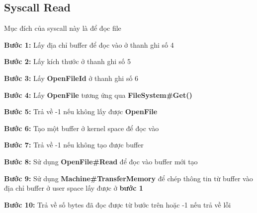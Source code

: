 \subsection{Syscall Read}
Mục đích của syscall này là để đọc file
\begin{addmargin}[40pt]{0pt}
\textbf{Bước 1: }Lấy địa chỉ buffer để đọc vào ở thanh ghi số 4
\end{addmargin}
\begin{addmargin}[40pt]{0pt}
\textbf{Bước 2: }Lấy kích thước ở thanh ghi số 5
\end{addmargin}
\begin{addmargin}[40pt]{0pt}
\textbf{Bước 3: }Lấy \textbf{OpenFileId} ở thanh ghi số 6
\end{addmargin}
\begin{addmargin}[40pt]{0pt}
\textbf{Bước 4: }Lấy \textbf{OpenFile} tương ứng qua \textbf{FileSystem\#Get()}
\end{addmargin}
\begin{addmargin}[40pt]{0pt}
\textbf{Bước 5: }Trả về -1 nếu không lấy được \textbf{OpenFile}
\end{addmargin}
\begin{addmargin}[40pt]{0pt}
\textbf{Bước 6: }Tạo một buffer ở kernel space để đọc vào
\end{addmargin}
\begin{addmargin}[40pt]{0pt}
\textbf{Bước 7: }Trả về -1 nếu không tạo được buffer
\end{addmargin}
\begin{addmargin}[40pt]{0pt}
\textbf{Bước 8: }Sử dụng \textbf{OpenFile\#Read} để đọc vào buffer mới tạo
\end{addmargin}
\begin{addmargin}[40pt]{0pt}
\textbf{Bước 9: }Sử dụng \textbf{Machine\#TransferMemory} để chép thông tin từ buffer vào địa chỉ buffer ở user space lấy được ở \textbf{bước 1}
\end{addmargin}
\begin{addmargin}[40pt]{0pt}
\textbf{Bước 10: }Trả về số bytes đã đọc được từ bước trên hoặc -1 nếu trả về lỗi
\end{addmargin}

